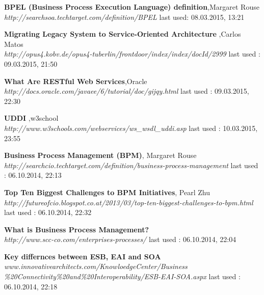 \documentclass[12pt]{article}
\begin{document}
\begin{thebibliography}{56}
   \textbf{BPEL (Business Process Execution Language) definition},Margaret Rouse \\
  \textit{http://searchsoa.techtarget.com/definition/BPEL}
  \newline last used: 08.03.2015, 13:21

    \textbf{Migrating Legacy System to Service-Oriented Architecture },Carlos Matos\\
    \textit{http://opus4.kobv.de/opus4-tuberlin/frontdoor/index/index/docId/2999}
    \newline last used : 09.03.2015, 21:50

    \textbf{What Are RESTful Web Services},Oracle \\
    \textit{http://docs.oracle.com/javaee/6/tutorial/doc/gijqy.html}
    \newline last used : 09.03.2015, 22:30

    \textbf{UDDI },w3school\\
    \textit{http://www.w3schools.com/webservices/ws\_wsdl\_uddi.asp}
    \newline last used : 10.03.2015, 23:55

   \textbf{Business Process Management (BPM)}, Margaret Rouse\\
  \textit{http://searchcio.techtarget.com/definition/business-process-management}
  \newline last used : 06.10.2014, 22:13
  

   \textbf{Top Ten Biggest Challenges to BPM Initiatives}, Pearl Zhu\\
  \textit{http://futureofcio.blogspot.co.at/2013/03/top-ten-biggest-challenges-to-bpm.html}
  \newline last used : 06.10.2014, 22:32
  
   \textbf{What is Business Process Management? }\\
  \textit{http://www.scc-co.com/enterprises-processes/}
  \newline last used : 06.10.2014, 22:04


   \textbf{Key differnces between ESB, EAI and SOA}\\
  \textit{www.innovativearchitects.com/KnowloedgeCenter/Business \\ \%20Connectivity\%20and\%20Interoperability/ESB-EAI-SOA.aspx}
  \newline last used : 06.10.2014, 22:18



\end{thebibliography}
\end{document}
